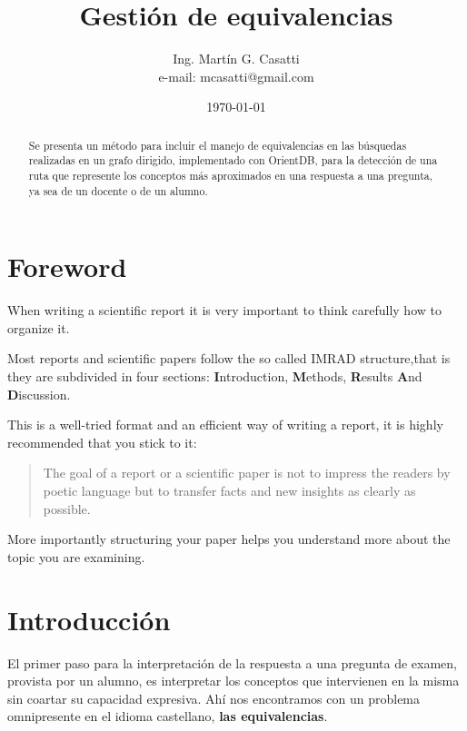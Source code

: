 \documentclass[a4paper,headsepline,footsepline,draft=false]{scrartcl}
\begin{document}
\title{Gestión de equivalencias}
\author{Ing. Martín G. Casatti \\ e-mail: mcasatti@gmail.com}
\date{\today}
\maketitle
\thispagestyle{headings}

\begin{abstract}
	Se presenta un método para incluir el manejo de equivalencias en las búsquedas realizadas en un grafo dirigido, implementado con OrientDB\cite{orientdb}, para la detección de una ruta que represente los conceptos más aproximados en una respuesta a una pregunta, ya sea de un docente o de un alumno.
\end{abstract}

\ifdefined\borrador
\section*{Foreword}
When writing a scientific report it is very important to think carefully how to organize it.

Most reports and scientific papers follow the so called IMRAD structure,that is they are subdivided in four sections: \textbf{I}ntroduction, \textbf{M}ethods, \textbf{R}esults \textbf{A}nd \textbf{D}iscussion.

This is a well-tried format and an efficient way of writing a report, it is highly recommended that you stick to it: 

\begin{quote}
	The goal of a report or a scientific paper is not to impress the readers by poetic language but to transfer facts and new insights as clearly as possible.
\end{quote}

More importantly structuring your paper helps you understand more about the topic you are examining.
\fi

\section{Introducción}

El primer paso para la interpretación de la respuesta a una pregunta de examen, provista por un alumno, es interpretar los conceptos que intervienen en la misma sin coartar su capacidad expresiva. Ahí nos encontramos con un problema omnipresente en el idioma castellano, \textbf{las equivalencias}. 
\end{document}
